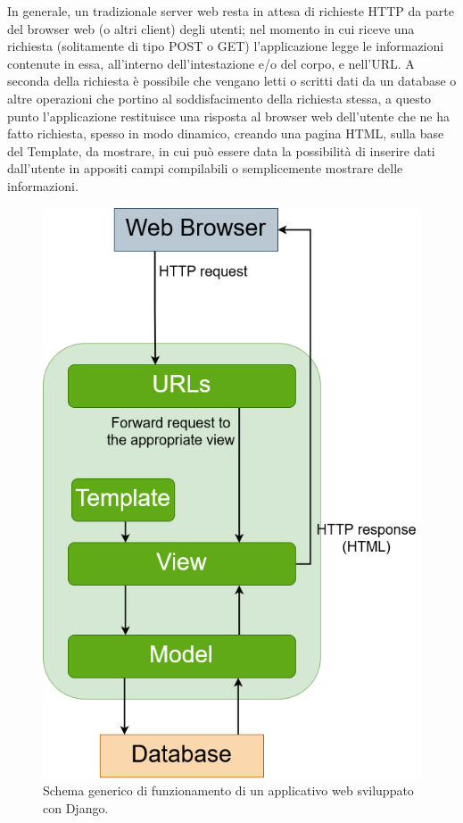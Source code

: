 In generale, un tradizionale server web resta in attesa di richieste HTTP da parte del browser web (o altri client) degli utenti; nel momento in cui riceve 
una richiesta (solitamente di tipo POST o GET) 
l'applicazione legge le informazioni contenute in essa, all'interno dell'intestazione e/o del corpo, e nell'URL. A seconda della richiesta è possibile che 
vengano letti o scritti dati da un database o altre operazioni che portino al soddisfacimento della richiesta stessa, a questo punto l'applicazione restituisce una 
risposta al browser web dell'utente che ne ha fatto richiesta, spesso in modo dinamico, creando una pagina HTML, sulla base del Template,
da mostrare, in cui può essere data la possibilità di inserire dati dall'utente in appositi campi compilabili o semplicemente mostrare delle informazioni.
%
\newpage
%
\begin{figure}[ht!]
    \centering
    \includegraphics[scale=0.3]{images/Django_doc.png}
    \caption{Schema generico di funzionamento di un applicativo web sviluppato con Django.}
    \label{fig:django_doc}
\end{figure}

